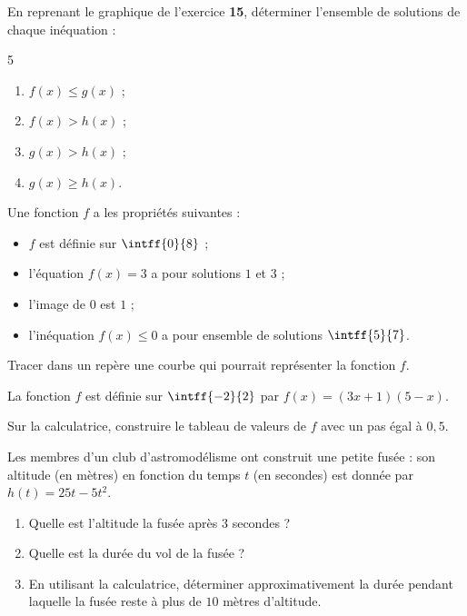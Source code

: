 \exo

En reprenant le graphique de l'exercice \textbf{15}, déterminer l'ensemble de solutions de chaque inéquation :
\vspace{-12pt}
\setlength{\columnsep}{1cm}
\setlength{\columnseprule}{0pt}
\begin{multicols}{5}
\begin{enumerate}
\item $f(x)\leqslant g(x)$ ;
\item $f(x)>h(x)$ ;
\item $g(x)>h(x)$ ;
\item $g(x)\geqslant h(x)$.
\end{enumerate}
\end{multicols}
\vspace{-6pt}

\exo

Une fonction $f$ a les propriétés suivantes :
\begin{itemize}
\item $f$ est définie sur $\intff{0}{8}$ ;
\item l'équation $f(x)=3$ a pour solutions $1$ et $3$ ;
\item l'image de $0$ est $1$ ;
\item l'inéquation $f(x)\leqslant 0$ a pour ensemble de solutions $\intff{5}{7}$.
\end{itemize}
Tracer dans un repère une courbe qui pourrait représenter la fonction $f$.

\exo

La fonction $f$ est définie sur $\intff{-2}{2}$ par $f(x)=(3x+1)(5-x)$.

Sur la calculatrice, construire le tableau de valeurs de $f$ avec un pas égal à $0,5$.

\exo

Les membres d'un club d'astromodélisme ont construit une petite fusée : son altitude (en mètres) en fonction du temps $t$ (en secondes) est donnée par $h(t)=25t-5t^2$.

\begin{enumerate}
\item Quelle est l'altitude la fusée après $3$ secondes ?
\item Quelle est la durée du vol de la fusée ?
\item En utilisant la calculatrice, déterminer approximativement la durée pendant laquelle la fusée reste à plus de $10$ mètres d'altitude.
\end{enumerate}

